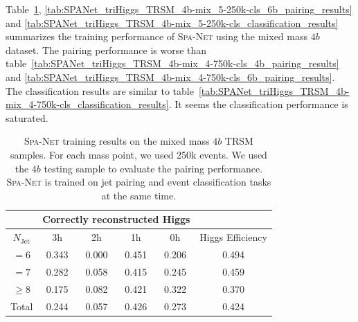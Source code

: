 \documentclass[12pt]{article}
\begin{document}
    Table~\ref{tab:SPANet_triHiggs_TRSM_4b-mix_5-250k-cls_4b_pairing_results}, \ref{tab:SPANet_triHiggs_TRSM_4b-mix_5-250k-cls_6b_pairing_results} and \ref{tab:SPANet_triHiggs_TRSM_4b-mix_5-250k-cls_classification_results} summarizes the training performance of \textsc{Spa-Net} using the mixed mass $4b$ dataset. The pairing performance is worse than table~\ref{tab:SPANet_triHiggs_TRSM_4b-mix_4-750k-cls_4b_pairing_results} and \ref{tab:SPANet_triHiggs_TRSM_4b-mix_4-750k-cls_6b_pairing_results}. The classification results are similar to table~\ref{tab:SPANet_triHiggs_TRSM_4b-mix_4-750k-cls_classification_results}. It seems the classification performance is saturated.

    \begin{table}[htpb]
        \centering
        \caption{\textsc{Spa-Net} training results on the mixed mass $4b$ TRSM samples. For each mass point, we used 250k events. We used the $4b$ testing sample to evaluate the pairing performance. \textsc{Spa-Net} is trained on jet pairing and event classification tasks at the same time.}
        \label{tab:SPANet_triHiggs_TRSM_4b-mix_5-250k-cls_4b_pairing_results}
        \begin{tabular}{c|cccc|c}
                       & \multicolumn{4}{c|}{Correctly reconstructed Higgs} &                  \\ \hline
        $N_\text{Jet}$ & 3h          & 2h         & 1h         & 0h         & Higgs Efficiency \\ \hline
        $=6$           & 0.343 & 0.000 & 0.451 & 0.206 & 0.494            \\
        $=7$           & 0.282 & 0.058 & 0.415 & 0.245 & 0.459            \\
        $\ge 8$        & 0.175 & 0.082 & 0.421 & 0.322 & 0.370            \\ \hline
        Total          & 0.244 & 0.057 & 0.426 & 0.273 & 0.424
        \end{tabular}
    \end{table}
\end{document}
